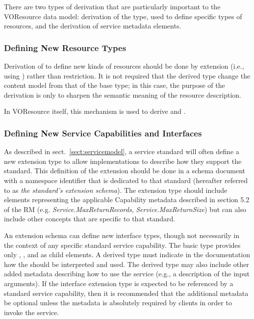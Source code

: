 \documentclass[11pt,a4paper]{ivoa}
\begin{document}
There are two types of derivation that are particularly important to
the VOResource data model:  derivation of the 
type, used to define specific types of resources, and the derivation
of service metadata elements.


\subsubsection{Defining New Resource Types}
\label{sect:definingresourcetypes}


Derivation of  to define new kinds of
resources should be done by extension (i.e., using
) rather than restriction.  It is
not required that the derived type change the content model from that
of the  base type; in this case, the purpose
of the derivation is only to sharpen the semantic meaning of the
resource description.

In VOResource itself, this mechanism is used to derive
and .

\subsubsection{Defining New Service Capabilities and Interfaces}
\label{sect:serviceelements}


As described in sect.~\ref{sect:servicemodel}, a service
standard will often define a new  extension
type to allow implementations to describe how they support the
standard.  This definition of the  extension
should be done in a schema document with a namespace identifier that
is dedicated to that standard (hereafter referred to as \emph{the
standard's extension schema}).  The extension type should include
elements representing the applicable Capability metadata described in
section 5.2 of the RM
(e.g. \emph{Service.MaxReturnRecords}, \emph{Service.MaxReturnSize})
but can also include other concepts that are specific to that standard.


An extension schema can define new interface types, though not
necessarily in the context of any specific standard service
capability.  The basic  type provides only
, , and  as child
elements.  A derived  type must indicate in
the documentation how the  should be
interpreted and used.  The derived type may also include other added
metadata describing how to use the service (e.g., a description of the
input arguments).  If the interface extension type is expected to be
referenced by a standard service capability, then it is recommended
that the additional metadata be optional unless the metadata is
absolutely required by clients in order to invoke the service.
\end{document}
